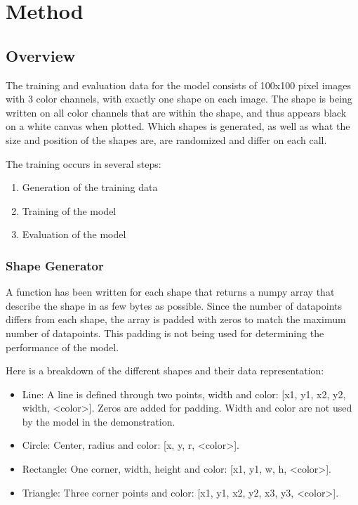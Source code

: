 \documentclass[12pt, a4paper, titlepage]{report}
\begin{document}

\chapter{Method}

\section{Overview}

The training and evaluation data for the model consists of 100x100 pixel images with 3 color channels, with exactly one shape on each image. The shape is being written on all color channels that are within the shape, and thus appears black on a white canvas when plotted. Which shapes is generated, as well as what the size and position of the shapes are, are randomized and differ on each call.

The training occurs in several steps:
\begin{enumerate}
   \item Generation of the training data
   \item Training of the model
   \item Evaluation of the model
\end{enumerate}


\subsection{Shape Generator}

A function has been written for each shape that returns a numpy array that describe the shape in as few bytes as possible. Since the number of datapoints differs from each shape, the array is padded with zeros to match the maximum number of datapoints. This padding is not being used for determining the performance of the model.

Here is a breakdown of the different shapes and their data representation:
\begin{itemize}
   \item Line: A line is defined through two points, width and color: [x1, y1, x2, y2, width, <color>]. Zeros are added for padding. Width and color are not used by the model in the demonstration.
   \item Circle: Center, radius and color: [x, y, r, <color>].
   \item Rectangle: One corner, width, height and color: [x1, y1, w, h, <color>].
   \item Triangle: Three corner points and color: [x1, y1, x2, y2, x3, y3, <color>].
\end{itemize}
\end{document}
